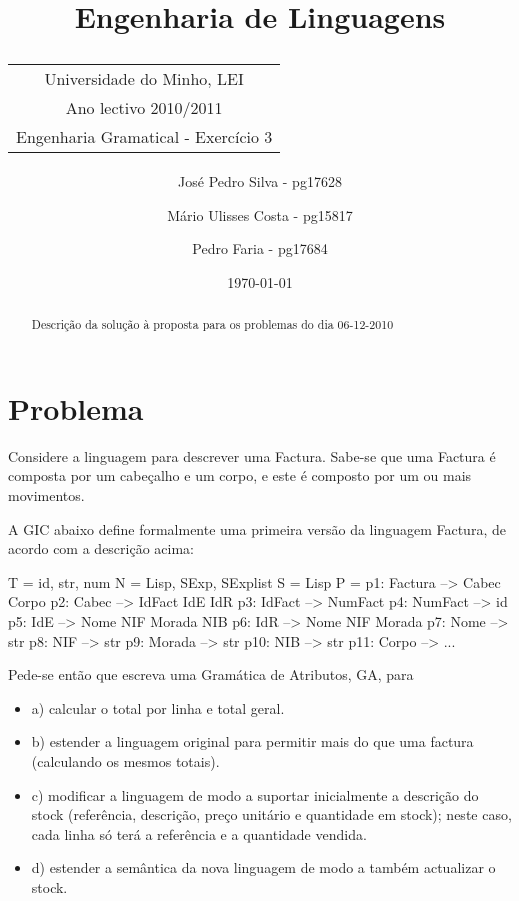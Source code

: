 \documentclass[11pt,a4paper]{article}
\title{\sf Engenharia de Linguagens \\
\begin{tabular}{c}
    {\small Universidade do Minho}, {\small LEI}\\
    {\small Ano lectivo 2010/2011}\\
    {\small Engenharia Gramatical - Exercício 3}\\
\end{tabular}
}
\author{
    {\small José Pedro Silva - pg17628} \and
    {\small Mário Ulisses Costa - pg15817} \and
    {\small Pedro Faria - pg17684}}
\date{{\small \today}}
\begin{document}
\maketitle

\begin{abstract}

Descrição da solução à proposta para os problemas do dia 06-12-2010
\end{abstract}

\tableofcontents

\section{Problema}
Considere a linguagem para descrever uma Factura. Sabe-se que uma Factura é composta por um cabeçalho e um corpo, e este é composto por um ou mais movimentos.

A GIC abaixo define formalmente uma primeira versão da linguagem Factura, de acordo com a descrição acima:

\begin{code_txt}
      T = { id, str, num}
      N = { Lisp, SExp, SExplist }
      S = Lisp
      P = {
            p1:  Factura  --> Cabec Corpo
            p2:  Cabec    --> IdFact IdE IdR
            p3:  IdFact   --> NumFact
            p4:  NumFact  --> id
            p5:  IdE      --> Nome NIF Morada NIB
            p6:  IdR      --> Nome NIF Morada
            p7:  Nome     --> str
            p8:  NIF      --> str
            p9:  Morada   --> str
            p10: NIB      --> str
            p11: Corpo    --> ...
          }
\end{code_txt}

Pede-se então que escreva uma Gramática de Atributos, GA, para
\begin{itemize}
    \item a) calcular o total por linha e total geral. 

    \item b) estender a linguagem original para permitir mais do que uma factura (calculando os mesmos totais). 

    \item c) modificar a linguagem de modo a suportar inicialmente a descrição do stock (referência, descrição, preço unitário e quantidade em stock); neste caso, cada linha só terá a referência e a quantidade vendida. 

    \item d) estender a semântica da nova linguagem de modo a também actualizar o stock. 
\end{itemize}
\end{document}
